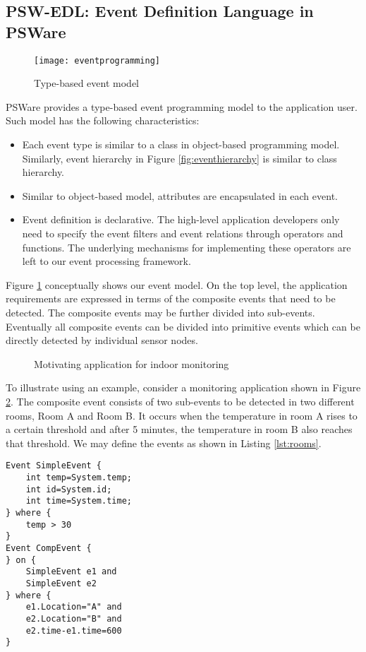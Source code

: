 \subsection{PSW-EDL: Event Definition Language in PSWare}
\begin{figure}
\centering
\texttt{[image: eventprogramming]}
\caption{Type-based event model}
\label{fig:eventprogramming}
\end{figure}

PSWare provides a type-based event programming model to the application user. Such model has the following characteristics:
\begin{itemize}
\item Each event type is similar to a class in object-based programming model. Similarly, event hierarchy in Figure \ref{fig:eventhierarchy} is similar to class hierarchy.
\item Similar to object-based model, attributes are encapsulated in each event.
\item Event definition is declarative. The high-level application developers only need to specify the event filters and event relations through operators and functions. The underlying mechanisms for implementing these operators are left to our event processing framework.
\end{itemize}

Figure \ref{fig:eventprogramming} conceptually shows our event model. On the top level, the application requirements are expressed in terms of the composite events that need to be detected. The composite events may be further divided into sub-events. Eventually all composite events can be divided into primitive events which can be directly detected by individual sensor nodes.

\begin{figure}
\centering
{}
\caption{Motivating application for indoor monitoring}
\label{fig:rooms}
\end{figure}

To illustrate using an example, consider a monitoring application shown in Figure \ref{fig:rooms}. The composite event consists of two sub-events to be detected in two different rooms, Room A and Room B. It occurs when the temperature in room A rises to a certain threshold and after 5 minutes, the temperature in room B also reaches that threshold. We may define the events as shown in Listing \ref{lst:rooms}.
\begin{lstlisting}[caption=Example of using even-based programming model, label=lst:rooms]
Event SimpleEvent {
	int temp=System.temp;
	int id=System.id;
	int time=System.time;
} where {
	temp > 30
}
Event CompEvent {
} on {
	SimpleEvent e1 and
	SimpleEvent e2
} where {
	e1.Location="A" and
	e2.Location="B" and
	e2.time-e1.time=600
}
\end{lstlisting}

